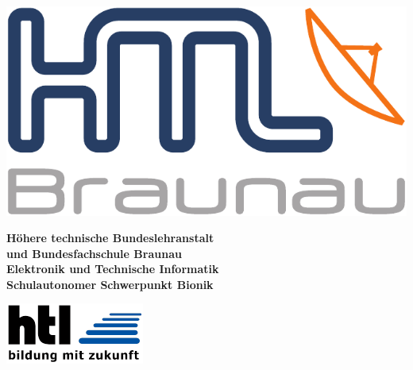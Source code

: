 
\pagebreak
\thispagestyle{empty}

\begin{minipage}[c]{0.20\linewidth}
\includegraphics[width=0.8\linewidth]{media/images/htl_c_cmyk_rein}
\end{minipage}
\begin{minipage}[c]{0.6\linewidth}
\begin{center}
{\bfseries\sffamily\large Höhere  technische  Bundeslehranstalt\\
und  Bundesfachschule  Braunau\\
Elektronik und Technische Informatik\\
{\normalsize Schulautonomer Schwerpunkt Bionik} }
\end{center}
\end{minipage}
\begin{minipage}[c]{0.2\linewidth}
\hfill \includegraphics[width=0.8\linewidth]{media/images/htl-bildung-mit-zukunft}
\end{minipage}\\

\vspace{1em}


